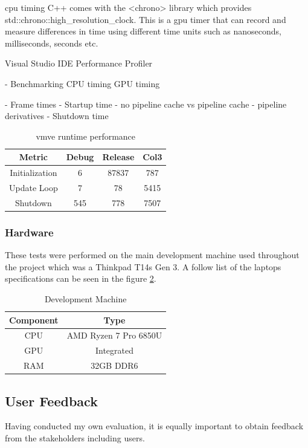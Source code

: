 \documentclass[11pt]{article}
\begin{document}
\gls{cpu} timing C++ comes with the <chrono> library which provides
std::chrono::high\_resolution\_clock. This is a \gls{gpu} timer that
can record and measure differences in time using different
time units such as nanoseconds, milliseconds, seconds etc.

Visual Studio IDE Performance
Profiler

- Benchmarking
    CPU timing
    GPU timing


- Frame times
- Startup time
	- no pipeline cache vs pipeline cache
	- pipeline derivatives
- Shutdown time


\begin{table}[h!]
\centering
\begin{tabular}{||c c c c||} 
  \hline
  Metric & Debug & Release & Col3 \\ [0.5ex] 
  \hline\hline
  Initialization & 6 & 87837 & 787 \\ 
  Update Loop & 7 & 78 & 5415 \\
  Shutdown & 545 & 778 & 7507 \\ [1ex] 
  \hline
\end{tabular}
\caption{\gls{vmve} runtime performance}
\label{fig:runtime_performance}
\end{table}

\subsubsection{Hardware}
These tests were performed on the main development machine used throughout the
project which was a Thinkpad T14s Gen 3. A follow list of the laptops specifications
can be seen in the figure \ref{fig:development_machine}.

\begin{table}[h!]
\centering
\begin{tabular}{|| c c ||} 
  \hline
  Component & Type \\ [0.5ex] 
  \hline\hline
  CPU & AMD Ryzen 7 Pro 6850U  \\ 
  GPU & Integrated \\
  RAM & 32GB DDR6 \\ [1ex] 
  \hline
\end{tabular}
\caption{Development Machine}
\label{fig:development_machine}
\end{table}

\subsection{User Feedback}
Having conducted my own evaluation, it is equally important to obtain feedback
from the stakeholders including users.
\end{document}
